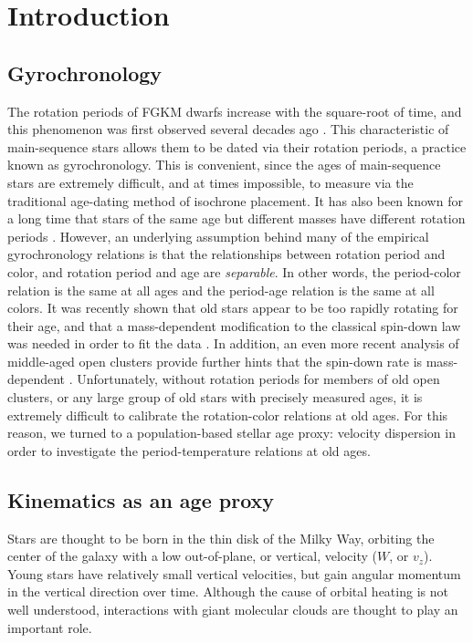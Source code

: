 \section{Introduction}

\subsection{Gyrochronology}
The rotation periods of FGKM dwarfs increase with the square-root of time, and
this phenomenon was first observed several decades ago \citep{skumanich1972}.
This characteristic of main-sequence stars allows them to be dated via their
rotation periods, a practice known as gyrochronology.
This is convenient, since the ages of main-sequence stars are extremely
difficult, and at times impossible, to measure via the traditional age-dating
method of isochrone placement.
It has also been known for a long time that stars of the same age but
different masses have different rotation periods .
However, an underlying assumption behind many of the empirical gyrochronology
relations \citep[\eg][]{barnes2003, barnes2007, mamajek2008, meibom2011,
angus2015, angus2019} is that the relationships between rotation period and
color, and rotation period and age are {\it separable}.
In other words, the period-color relation is the same at all ages and the
period-age relation is the same at all colors.
It was recently shown that old stars appear to be too rapidly rotating for
their age, \citep{angus2015, vansaders2016, vansaders2018} and that a
mass-dependent modification to the classical \citet{skumanich1972} spin-down
law was needed in order to fit the data \citep{vansaders2016, vansaders2018}.
In addition, an even more recent analysis of middle-aged open clusters provide
further hints that the spin-down rate is mass-dependent \citep{curtis2019}.
Unfortunately, without rotation periods for members of old open clusters, or
any large group of old stars with precisely measured ages, it is extremely
difficult to calibrate the rotation-color relations at old ages.
For this reason, we turned to a population-based stellar age proxy: velocity
dispersion in order to investigate the period-temperature relations at old
ages.

\subsection{Kinematics as an age proxy}

Stars are thought to be born in the thin disk of the Milky Way, orbiting the
center of the galaxy with a low out-of-plane, or vertical, velocity ($W$, or
$v_z$).
Young stars have relatively small vertical velocities, but gain angular
momentum in the vertical direction over time.
Although the cause of orbital heating is not well understood, interactions
with giant molecular clouds are thought to play an important role.

